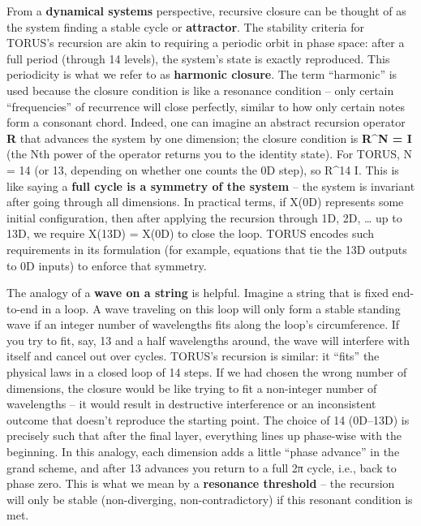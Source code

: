 \documentclass[
]{article}
\begin{document}
From a \textbf{dynamical systems} perspective, recursive closure can be
thought of as the system finding a stable cycle or \textbf{attractor}.
The stability criteria for TORUS's recursion are akin to requiring a
periodic orbit in phase space: after a full period (through 14 levels),
the system's state is exactly reproduced. This periodicity is what we
refer to as \textbf{harmonic closure}. The term ``harmonic'' is used
because the closure condition is like a resonance condition -- only
certain ``frequencies'' of recurrence will close perfectly, similar to
how only certain notes form a consonant chord. Indeed, one can imagine
an abstract recursion operator \textbf{R} that advances the system by
one dimension; the closure condition is \textbf{R\^{}N = I} (the Nth
power of the operator returns you to the identity state)\hspace{0pt}.
For TORUS, N = 14 (or 13, depending on whether one counts the 0D step),
so R\^{}14 \approx I. This is like saying a \textbf{full cycle is a symmetry
of the system} -- the system is invariant after going through all
dimensions. In practical terms, if X(0D) represents some initial
configuration, then after applying the recursion through 1D, 2D,
\ldots{} up to 13D, we require X(13D) = X(0D) to close the
loop\hspace{0pt}. TORUS encodes such requirements in its formulation
(for example, equations that tie the 13D outputs to 0D inputs) to
enforce that symmetry.

The analogy of a \textbf{wave on a string} is helpful. Imagine a string
that is fixed end-to-end in a loop. A wave traveling on this loop will
only form a stable standing wave if an integer number of wavelengths
fits along the loop's circumference. If you try to fit, say, 13 and a
half wavelengths around, the wave will interfere with itself and cancel
out over cycles. TORUS's recursion is similar: it ``fits'' the physical
laws in a closed loop of 14 steps. If we had chosen the wrong number of
dimensions, the closure would be like trying to fit a non-integer number
of wavelengths -- it would result in destructive interference or an
inconsistent outcome that doesn't reproduce the starting
point\hspace{0pt}. The choice of 14 (0D--13D) is precisely such that
after the final layer, everything lines up phase-wise with the
beginning. In this analogy, each dimension adds a little ``phase
advance'' in the grand scheme, and after 13 advances you return to a
full 2π cycle, i.e., back to phase zero\hspace{0pt}. This is what we
mean by a \textbf{resonance threshold} -- the recursion will only be
stable (non-diverging, non-contradictory) if this resonant condition is
met.
\end{document}
